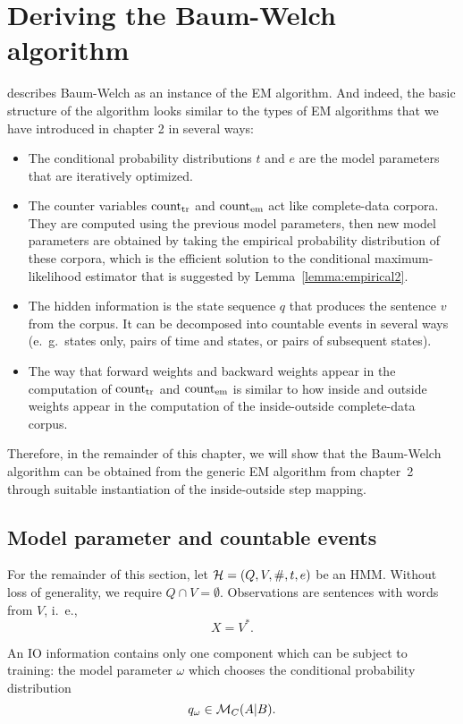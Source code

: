 \section{Deriving the Baum-Welch algorithm}\label{sect:03-deriving}

\cite{jm09} describes Baum-Welch as an instance of the EM algorithm. And
indeed, the basic structure of the algorithm looks similar to the types of EM
algorithms that we have introduced in chapter 2 in several ways:
\begin{itemize}
 \item The conditional probability distributions $t$ and $e$ are the model
  parameters that are iteratively optimized.
 \item The counter variables $\operatorname{count}_\mathrm{tr}$ and $\operatorname{count}_\mathrm{em}$ act like
  complete-data corpora. They are computed using the previous model parameters,
  then new model parameters are obtained by taking the empirical probability
  distribution of these corpora, which is the efficient solution to the
  conditional maximum-likelihood estimator that is suggested by
  Lemma~\ref{lemma:empirical2}.
 \item The hidden information is the state sequence $q$ that produces the
  sentence $v$ from the corpus. It can be decomposed into countable events in
  several ways (e.~g.~states only, pairs of time and states, or pairs of
  subsequent states).
 \item The way that forward weights and backward weights appear in the
  computation of $\operatorname{count}_\mathrm{tr}$ and $\operatorname{count}_\mathrm{em}$ is similar to how
  inside and outside weights appear in the computation of the inside-outside
  complete-data corpus.
\end{itemize}

Therefore, in the remainder of this chapter, we will show that the Baum-Welch
algorithm can be obtained from the generic EM algorithm from chapter~2 through
suitable instantiation of the inside-outside step mapping.

\subsection{Model parameter and countable events}

For the remainder of this section, let $\mathcal H = (Q,V,\#,t,e)$ be an HMM. Without
loss of generality, we require $Q\cap V=\emptyset$. Observations are sentences
with words from $V$, i.~e.,
\[
 X = V^*.
\]

An IO information contains only one component which can be subject to training:
the model parameter $\omega$ which chooses the conditional probability
distribution
\[
 q_\omega \in \mathcal M_C(A|B).
\]


